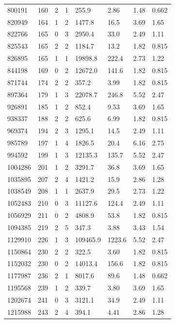 \documentclass[preview]{standalone}
\begin{document}
{{{\begin{tabular}{L{1.2cm}C{1.2cm} C{0.3cm}C{0.5cm} C{1.4cm}C{1.4cm} C{1.4cm}C{1.4cm}}
  800191  &   160  & 2     &  1 &  255.9  & 2.86  & 1.48 &  0.662   \\ 
  820949  &   164  & 1     &  2 &  1477.8  & 16.5  & 3.69 &  1.65   \\ 
  822766  &   165  & 0     &  3 &  2950.4  & 33.0  & 2.49 &  1.11   \\ 
  825543  &   165  & 2     &  2 &  1184.7  & 13.2  & 1.82 &  0.815   \\ 
  826895  &   165  & 1     &  1 &  19898.8  & 222.4  & 2.73 &  1.22   \\ 
  844198  &   169  & 0     &  2 &  12672.0  & 141.6  & 1.82 &  0.815   \\ 
  871744  &   174  & 2     &  2 &  357.2  & 3.99  & 1.82 &  0.815   \\ 
  897364  &   179  & 1     &  3 &  22078.7  & 246.8  & 5.52 &  2.47   \\ 
  926891  &   185  & 1     &  2 &  852.4  & 9.53  & 3.69 &  1.65   \\ 
  938337  &   188  & 2     &  2 &  625.6  & 6.99  & 1.82 &  0.815   \\ 
  969374  &   194  & 2     &  3 &  1295.1  & 14.5  & 2.49 &  1.11   \\ 
  985789  &   197  & 1     &  4 &  1826.5  & 20.4  & 6.16 &  2.75   \\ 
  994592  &   199  & 1     &  3 &  12135.3  & 135.7  & 5.52 &  2.47   \\ 
  1004286  &   201  & 1     &  2 &  3291.7  & 36.8  & 3.69 &  1.65   \\ 
  1035895  &   207  & 2     &  4 &  1421.2  & 15.9  & 2.86 &  1.28   \\ 
  1038549  &   208  & 1     &  1 &  2637.9  & 29.5  & 2.73 &  1.22   \\ 
  1052483  &   210  & 0     &  3 &  11127.6  & 124.4  & 2.49 &  1.11   \\ 
  1056929  &   211  & 0     &  2 &  4808.9  & 53.8  & 1.82 &  0.815   \\ 
  1094385  &   219  & 2     &  5 &  347.3  & 3.88  & 3.43 &  1.54   \\ 
  1129910  &   226  & 1     &  3 &  109465.9  & 1223.6  & 5.52 &  2.47   \\ 
  1150864  &   230  & 2     &  2 &  322.5  & 3.60  & 1.82 &  0.815   \\ 
  1152032  &   230  & 0     &  2 &  14013.4  & 156.6  & 1.82 &  0.815   \\ 
  1177987  &   236  & 2     &  1 &  8017.6  & 89.6  & 1.48 &  0.662   \\ 
  1195568  &   239  & 1     &  2 &  339.7  & 3.80  & 3.69 &  1.65   \\ 
  1202674  &   241  & 0     &  3 &  3121.1  & 34.9  & 2.49 &  1.11   \\ 
  1215988  &   243  & 2     &  4 &  394.1  & 4.41  & 2.86 &  1.28   \\ 
\hline 
\end{tabular} 

}}}
\end{document}
